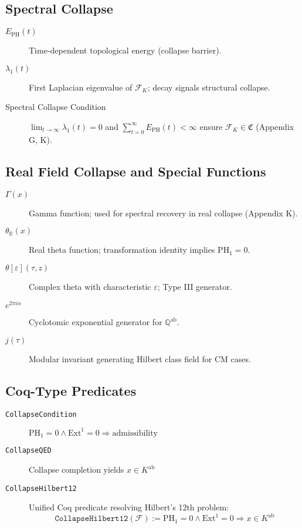\documentclass[11pt]{article}
\begin{document}
\subsection*{Spectral Collapse}

\begin{description}
  \item[\( E_{\mathrm{PH}}(t) \)] Time-dependent topological energy (collapse barrier).
  \item[\( \lambda_1(t) \)] First Laplacian eigenvalue of \( \mathcal{F}_K \); decay signals structural collapse.
  \item[Spectral Collapse Condition]  
  \( \lim_{t \to \infty} \lambda_1(t) = 0 \) and \( \sum_{t=0}^\infty E_{\mathrm{PH}}(t) < \infty \) ensure \( \mathcal{F}_K \in \mathfrak{C} \) (Appendix G, K).
\end{description}

\subsection*{Real Field Collapse and Special Functions}

\begin{description}
  \item[\( \Gamma(x) \)] Gamma function; used for spectral recovery in real collapse (Appendix K).
  \item[\( \theta_{\mathbb{R}}(x) \)] Real theta function; transformation identity implies \( \mathrm{PH}_1 = 0 \).
  \item[\mbox{\( \theta[\varepsilon](\tau, z) \)}] Complex theta with characteristic \( \varepsilon \); Type III generator.
  \item[\( e^{2\pi i \alpha} \)] Cyclotomic exponential generator for \( \mathbb{Q}^{\mathrm{ab}} \).
  \item[\( j(\tau) \)] Modular invariant generating Hilbert class field for CM cases.
\end{description}

\subsection*{Coq-Type Predicates}

\begin{description}
  \item[\texttt{CollapseCondition}]  
  \( \mathrm{PH}_1 = 0 \wedge \mathrm{Ext}^1 = 0 \Rightarrow \text{admissibility} \)
  
  \item[\texttt{CollapseQED}]  
  Collapse completion yields \( x \in K^{\mathrm{ab}} \)

  \item[\texttt{CollapseHilbert12}]  
  Unified Coq predicate resolving Hilbert's 12th problem:
  \[
  \texttt{CollapseHilbert12}(\mathcal{F}) := \mathrm{PH}_1 = 0 \wedge \mathrm{Ext}^1 = 0 \Rightarrow x \in K^{\mathrm{ab}}
  \]
\end{description}
\end{document}
